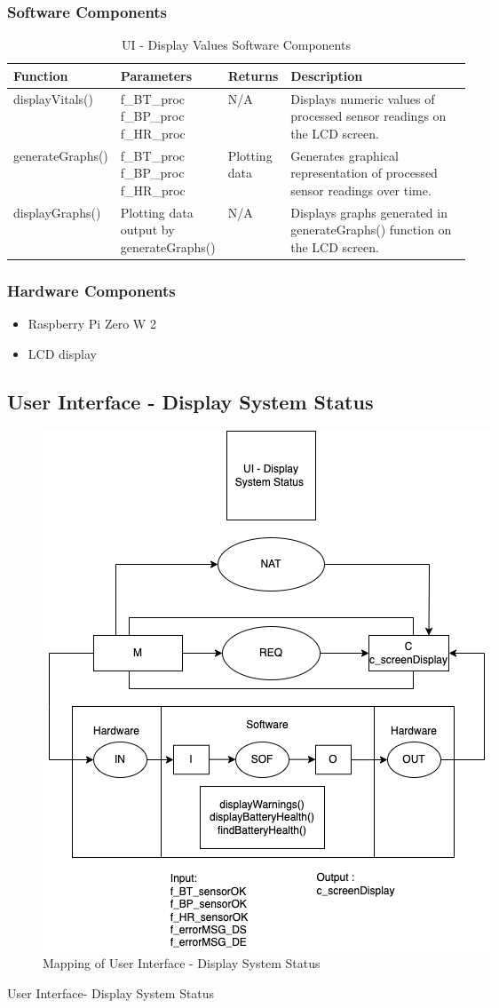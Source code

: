 \documentclass{article}
\newcounter{mnum}
\newcommand{\mthemnum}{M\themnum}
\begin{document}
\begin{description}
        \subsubsection{Software Components}
                \begin{longtable}{|l|p{0.2\linewidth}|l|p{0.4\linewidth}|}
                \caption{UI - Display Values Software Components}
                \hline
                \textbf{Function} & \textbf{Parameters} & \textbf {Returns} & \textbf{Description} \\
                \endhead
                \hline
                displayVitals()   & f\_BT\_proc f\_BP\_proc f\_HR\_proc & N/A & Displays numeric values of processed sensor readings on the LCD screen. \\
                \hline
                generateGraphs()   & f\_BT\_proc f\_BP\_proc f\_HR\_proc & Plotting data & Generates graphical representation of processed sensor readings over time.  \\
                \hline
                displayGraphs()   & Plotting data output by generateGraphs() & N/A & Displays graphs generated in generateGraphs() function on the LCD screen. \\
                \hline
                \end{longtable}
            \noindent
        \subsubsection{Hardware Components}
            \begin{itemize}
            \item Raspberry Pi Zero W 2
            \item LCD display
            \end{itemize}
    \newpage
    
    \subsection{User Interface - Display System Status}
     \begin{figure}[!htb]
    	\centering
    	\includegraphics[width=0.5\linewidth]{mccharts-UI-DispStatus.drawio.png}
    	\caption{Mapping of User Interface - Display System Status}
    \end{figure}
    \item [\refstepcounter{mnum} \mthemnum \label{UI_DSS}:] User Interface- Display System Status
    

\end{description}
\end{document}
